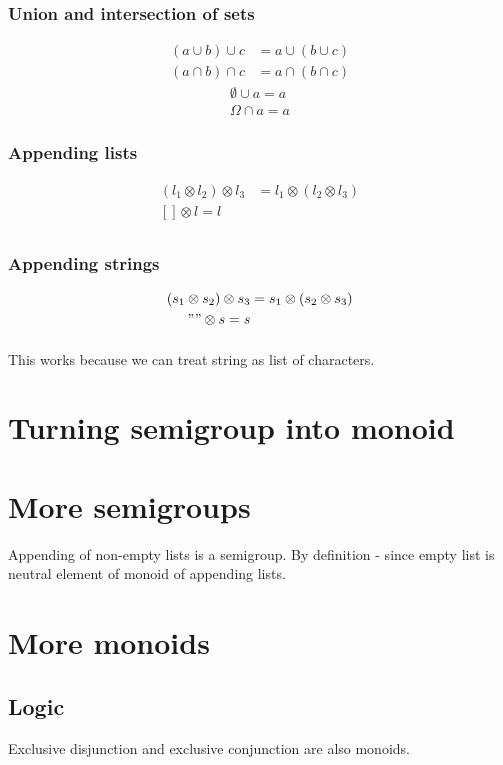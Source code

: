 \documentclass{article}
\begin{document}
    \subsubsection{Union and intersection of sets}

    \begin{align*}
        (a \cup b) \cup c &= a \cup (b \cup c) \\
        (a \cap b) \cap c &= a \cap (b \cap c)
    \end{align*}
    \begin{align*}
        \emptyset \cup a = a \\
        \Omega    \cap a = a 
    \end{align*}

    \subsubsection{Appending lists}

    \begin{align*}
        (l_1 \otimes l_2) \otimes l_3 &= l_1 \otimes (l_2 \otimes l_3) \\
        [] \otimes l = l \\
    \end{align*}

    \subsubsection{Appending strings}

    \begin{align*}
        (s_1 \otimes s_2) \otimes s_3 &= s_1 \otimes (s_2 \otimes s_3) \\
        "" \otimes s = s \\
    \end{align*}

    \paragraph{}
    This works because we can treat string as list of characters.

    \section{Turning semigroup into monoid}

    \section{More semigroups}

    Appending of non-empty lists is a semigroup. By definition - since empty list is neutral element of monoid of appending lists.

    \section{More monoids}

    \subsection{Logic}

    Exclusive disjunction and exclusive conjunction are also monoids.
\end{document}
